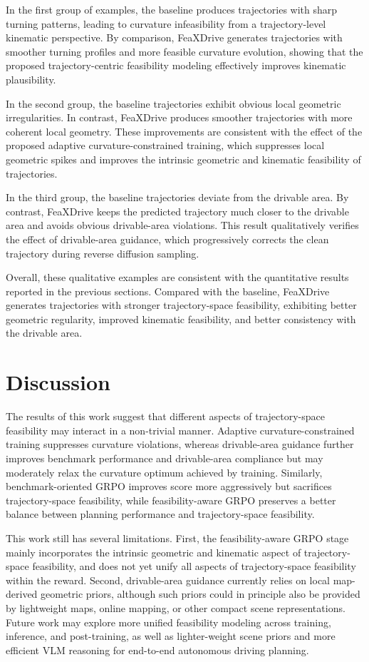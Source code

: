 \documentclass[3p,times,authoryear]{elsarticle}
\begin{document}
In the first group of examples, the baseline produces trajectories with sharp turning patterns, leading to curvature infeasibility from a trajectory-level kinematic perspective. By comparison, FeaXDrive generates trajectories with smoother turning profiles and more feasible curvature evolution, showing that the proposed trajectory-centric feasibility modeling effectively improves kinematic plausibility.

In the second group, the baseline trajectories exhibit obvious local geometric irregularities. In contrast, FeaXDrive produces smoother trajectories with more coherent local geometry. These improvements are consistent with the effect of the proposed adaptive curvature-constrained training, which suppresses local geometric spikes and improves the intrinsic geometric and kinematic feasibility of trajectories.

In the third group, the baseline trajectories deviate from the drivable area. By contrast, FeaXDrive keeps the predicted trajectory much closer to the drivable area and avoids obvious drivable-area violations. This result qualitatively verifies the effect of drivable-area guidance, which progressively corrects the clean trajectory during reverse diffusion sampling.

Overall, these qualitative examples are consistent with the quantitative results reported in the previous sections. Compared with the baseline, FeaXDrive generates trajectories with stronger trajectory-space feasibility, exhibiting better geometric regularity, improved kinematic feasibility, and better consistency with the drivable area.


\section{Discussion}

The results of this work suggest that different aspects of trajectory-space feasibility may interact in a non-trivial manner. Adaptive curvature-constrained training suppresses curvature violations, whereas drivable-area guidance further improves benchmark performance and drivable-area compliance but may moderately relax the curvature optimum achieved by training. Similarly, benchmark-oriented GRPO improves score more aggressively but sacrifices trajectory-space feasibility, while feasibility-aware GRPO preserves a better balance between planning performance and trajectory-space feasibility.

This work still has several limitations. First, the feasibility-aware GRPO stage mainly incorporates the intrinsic geometric and kinematic aspect of trajectory-space feasibility, and does not yet unify all aspects of trajectory-space feasibility within the reward. Second, drivable-area guidance currently relies on local map-derived geometric priors, although such priors could in principle also be provided by lightweight maps, online mapping, or other compact scene representations. Future work may explore more unified feasibility modeling across training, inference, and post-training, as well as lighter-weight scene priors and more efficient VLM reasoning for end-to-end autonomous driving planning.
\end{document}
